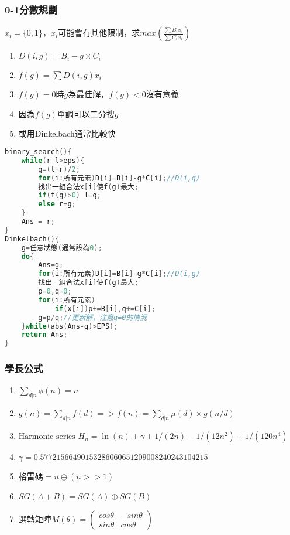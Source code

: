 \subsubsection{0-1分數規劃}
$x_i=\{0,1\}$，$x_i$可能會有其他限制，求$max\left(\frac{\sum B_ix_i}{\sum C_ix_i}\right)$
\begin{enumerate}\itemsep = -1pt
\item $D(i,g)=B_i-g\times C_i$
\item $f(g)=\sum D(i,g)x_i$
\item $f(g)=0$時$g$為最佳解，$f(g)<0$沒有意義
\item 因為$f(g)$單調可以二分搜$g$
\item 或用Dinkelbach通常比較快
\end{enumerate}
\begin{lstlisting}[language=C++]
binary_search(){
	while(r-l>eps){
		g=(l+r)/2;
		for(i:所有元素)D[i]=B[i]-g*C[i];//D(i,g) 
		找出一組合法x[i]使f(g)最大;
		if(f(g)>0) l=g;
		else r=g;
	}
	Ans = r;
}
Dinkelbach(){
	g=任意狀態(通常設為0);
	do{
		Ans=g;
		for(i:所有元素)D[i]=B[i]-g*C[i];//D(i,g) 
		找出一組合法x[i]使f(g)最大;
		p=0,q=0;
		for(i:所有元素)
			if(x[i])p+=B[i],q+=C[i];
		g=p/q;//更新解，注意q=0的情況 
	}while(abs(Ans-g)>EPS);
	return Ans;
}
\end{lstlisting}

\subsubsection{學長公式}
\begin{enumerate}\itemsep = -3pt
\item $\sum_{d|n} \phi(n) = n$
\item $g(n) = \sum_{d|n} f(d) => f(n) = \sum_{d|n} \mu(d) \times g(n/d)$
\item $\text{Harmonic series } H_n = \ln(n) + \gamma + 1/(2n) - 1/(12n^2) + 1/(120n^4)$
\item $ \gamma = 0.57721566490153286060651209008240243104215$
\item 格雷碼$=n\oplus (n>>1)$
\item $SG(A+B)=SG(A)\oplus SG(B)$
\item 選轉矩陣$M(\theta)= \left( \begin{array}{ccc}
cos\theta & -sin\theta \\ 
sin\theta &  cos\theta
\end{array} \right)$
\end{enumerate}

